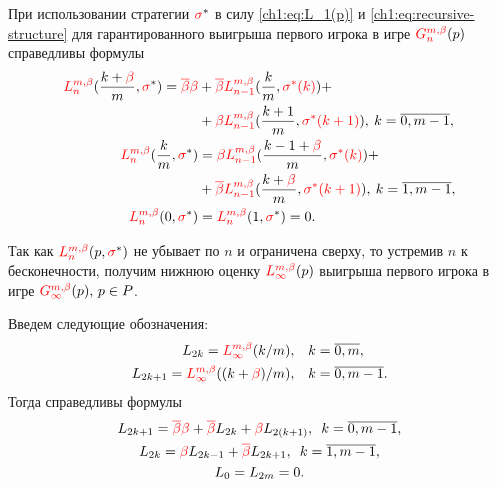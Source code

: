 {При использовании стратегии $\textcolor{red}{\sigma}^*$ в силу \eqref{ch1:eq:L_1(p)} и \eqref{ch1:eq:recursive-structure} для гарантированного выигрыша первого игрока в игре $\theG*{n}(p)$ справедливы формулы
\begin{equation}
  \begin{aligned}
    \label{ch1:eq:lowerBound:recurrence:function}
    \L*{n}(\frac{k + \Co}{m}, \sigmar^*)
    = \DCo\Co &+ \DCo\L*{n-1}(\frac{k}{m}, \sigmaran{*}{k}) + \\
    &+\Co\L*{n-1}(\frac{k+1}{m}, \sigmaran{*}{k+1}), \: k = \overline{0, m-1}, \\
    \L*{n}(\frac{k}{m}, \sigmar^*)
    &= \Co\L*{n-1}(\frac{k - 1 + \Co}{m}, \sigmaran{*}{k}) + \\
    &+ \DCo\L*{n-1}(\frac{k + \Co}{m}, \sigmaran{*}{k+1}), \: k = \overline{1, m-1}, \\
    \L*{n}(0, \sigmar^*) &= \L*{n}(1, \sigmar^*) = 0.
  \end{aligned}
\end{equation}

Так как $\L*{n}(p, \sigmar^*)$ не убывает по $n$ и ограничена сверху, то устремив $n$ к бесконечности, получим нижнюю оценку $\L*{\infty}(p)$ выигрыша первого игрока в игре $\theG*{\infty}(p), \, p \in P$.

Введем следующие обозначения:
\begin{align*}
  L_{2k} = \L*{\infty}(k/m), & \quad k = \overline{0, m},\\
  L_{2k+1} = \L*{\infty}((k+\Co)/m), & \quad k = \overline{0, m-1}.
\end{align*}
Тогда справедливы формулы
\begin{equation}
  \label{ch1:eq:lowerRecurrence}
  \begin{gathered}
    L_{2k+1} = \textcolor{red}{{\overline{\beta}}}\textcolor{red}{\beta} + \textcolor{red}{{\overline{\beta}}} L_{2k} + \textcolor{red}{\beta} L_{2(k+1)}, \enskip k = \overline{0, m-1},\\
    L_{2k} = \textcolor{red}{\beta} L_{2k-1} + \textcolor{red}{{\overline{\beta}}} L_{2k+1}, \enskip k = \overline{1, m-1},\\
    L_0 = L_{2m} = 0.
  \end{gathered}
\end{equation}

}
